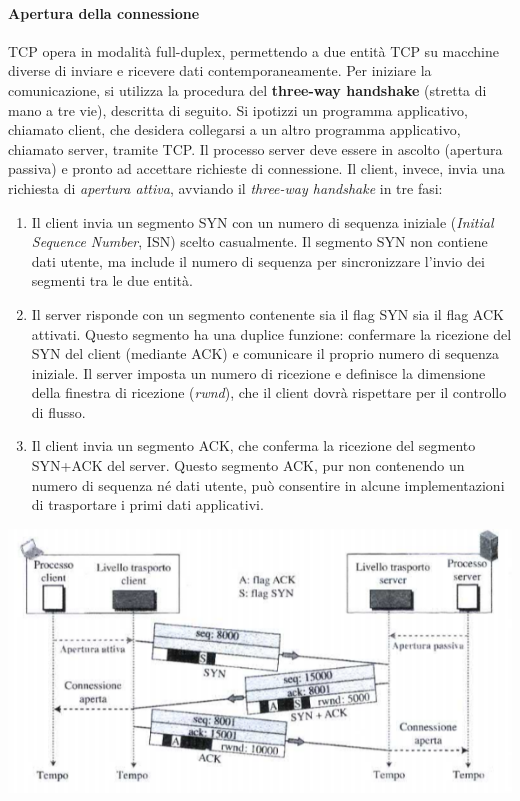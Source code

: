 \documentclass[12pt]{report}
\begin{document}
	\paragraph{Apertura della connessione}
	TCP opera in modalità full-duplex, permettendo a due entità TCP su macchine diverse di inviare e ricevere dati contemporaneamente. Per iniziare la comunicazione, si utilizza la procedura del \textbf{three-way handshake} (stretta di mano a tre vie), descritta di seguito.
	Si ipotizzi un programma applicativo, chiamato client, che desidera collegarsi a un altro programma applicativo, chiamato server, tramite TCP. Il processo server deve essere in ascolto (apertura passiva) e pronto ad accettare richieste di connessione. Il client, invece, invia una richiesta di \textit{apertura attiva}, avviando il \textit{three-way handshake} in tre fasi:
	\begin{enumerate}
		\item Il client invia un segmento SYN con un numero di sequenza iniziale (\textit{Initial Sequence Number}, ISN) scelto casualmente. Il segmento SYN non contiene dati utente, ma include il numero di sequenza per sincronizzare l’invio dei segmenti tra le due entità.
		
		\item Il server risponde con un segmento contenente sia il flag SYN sia il flag ACK attivati. Questo segmento ha una duplice funzione: confermare la ricezione del SYN del client (mediante ACK) e comunicare il proprio numero di sequenza iniziale. Il server imposta un numero di ricezione e definisce la dimensione della finestra di ricezione (\textit{rwnd}), che il client dovrà rispettare per il controllo di flusso.
		
		\item Il client invia un segmento ACK, che conferma la ricezione del segmento SYN+ACK del server. Questo segmento ACK, pur non contenendo un numero di sequenza né dati utente, può consentire in alcune implementazioni di trasportare i primi dati applicativi.
	\end{enumerate}
	\begin{center}
		\includegraphics[scale=0.6]{assets/threeway.png}
	\end{center}
\end{document}
